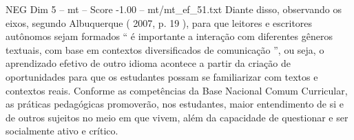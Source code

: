 \begin{textsample}{NEG Dim 5 – mt – Score -1.00 – mt/mt\_ef\_51.txt}
Diante disso, observando os eixos, segundo Albuquerque ( 2007, p. 19 ), para que leitores e escritores autônomos sejam formados “ é importante a interação com diferentes gêneros textuais, com base em contextos diversificados de comunicação ”, ou seja, o aprendizado efetivo de outro idioma acontece a partir da criação de oportunidades para que os estudantes possam se familiarizar com textos e contextos reais.
Conforme as competências da Base Nacional Comum Curricular, as práticas pedagógicas promoverão, nos estudantes, maior entendimento de si e de outros sujeitos no meio em que vivem, além da capacidade de questionar e ser socialmente ativo e crítico.

\end{textsample}
